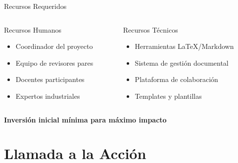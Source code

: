 \documentclass[10pt,aspectratio=169]{beamer}
\begin{document}
\begin{frame}{Recursos Requeridos}
	\begin{columns}
		\begin{column}{0.45\textwidth}
			\begin{block}{Recursos Humanos}
				\begin{itemize}
					\item Coordinador del proyecto
					\item Equipo de revisores pares
					\item Docentes participantes
					\item Expertos industriales
				\end{itemize}
			\end{block}
		\end{column}
				
		\begin{column}{0.45\textwidth}
			\begin{block}{Recursos Técnicos}
				\begin{itemize}
					\item Herramientas LaTeX/Markdown
					\item Sistema de gestión documental
					\item Plataforma de colaboración
					\item Templates y plantillas
				\end{itemize}
			\end{block}
		\end{column}
	\end{columns}
		
	\vspace{0.5cm}
			
	\begin{center}
		\textcolor{azulUTQ}{\textbf{Inversión inicial mínima para máximo impacto}}
	\end{center}
\end{frame}


\section{Llamada a la Acción}
\end{document}
